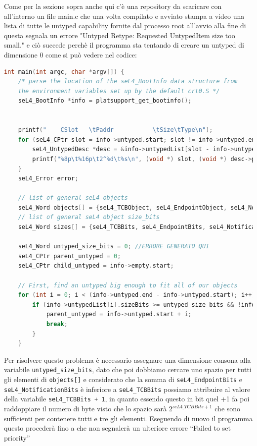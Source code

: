 Come per la sezione sopra anche qui c'è una repository da scaricare con all'interno un file main.c che una volta compilato e avviato stampa a video una lista di tutte le untyped capability fornite dal processo root all'avvio alla fine di questa segnala un errore "Untyped Retype: Requested UntypedItem size too small." e ciò succede perchè il programma sta tentando di creare un untyped di dimensione 0 come si può vedere nel codice:
\begin{lstlisting}[basicstyle=\tiny, language=C++]
int main(int argc, char *argv[]) {
    /* parse the location of the seL4_BootInfo data structure from
    the environment variables set up by the default crt0.S */
    seL4_BootInfo *info = platsupport_get_bootinfo();


    printf("    CSlot   \tPaddr           \tSize\tType\n");
    for (seL4_CPtr slot = info->untyped.start; slot != info->untyped.end; slot++) {
        seL4_UntypedDesc *desc = &info->untypedList[slot - info->untyped.start];
        printf("%8p\t%16p\t2^%d\t%s\n", (void *) slot, (void *) desc->paddr, desc->sizeBits, desc->isDevice ? "device untyped" : "untyped");
    }
    seL4_Error error;

    // list of general seL4 objects
    seL4_Word objects[] = {seL4_TCBObject, seL4_EndpointObject, seL4_NotificationObject};
    // list of general seL4 object size_bits
    seL4_Word sizes[] = {seL4_TCBBits, seL4_EndpointBits, seL4_NotificationBits};

    seL4_Word untyped_size_bits = 0; //ERRORE GENERATO QUI
    seL4_CPtr parent_untyped = 0;
    seL4_CPtr child_untyped = info->empty.start;

    // First, find an untyped big enough to fit all of our objects
    for (int i = 0; i < (info->untyped.end - info->untyped.start); i++) {
        if (info->untypedList[i].sizeBits >= untyped_size_bits && !info->untypedList[i].isDevice) {
            parent_untyped = info->untyped.start + i;
            break;
        }
    }
\end{lstlisting}
Per risolvere questo problema è necessario assegnare una dimensione consona alla variabile \texttt{untyped\_size\_bits}, dato che poi dobbiamo cercare uno spazio per tutti gli elementi di \texttt{objects[]} e considerato che la somma di \texttt{seL4\_EndpointBits} e \texttt{seL4\_NotificationBits} è inferiore a \texttt{seL4\_TCBBits} possiamo attribuire al valore della variabile \texttt{seL4\_TCBBits + 1}, in quanto essendo questo in bit quel +1 fa poi raddoppiare il numero di byte visto che lo spazio sarà $ 2^{seL4\_TCBBits + 1} $ che sono sufficienti per contenere tutti e tre gli elementi. Eseguendo di nuovo il programma questo procederà fino a che non segnalerà un ulteriore errore “Failed to set priority”
